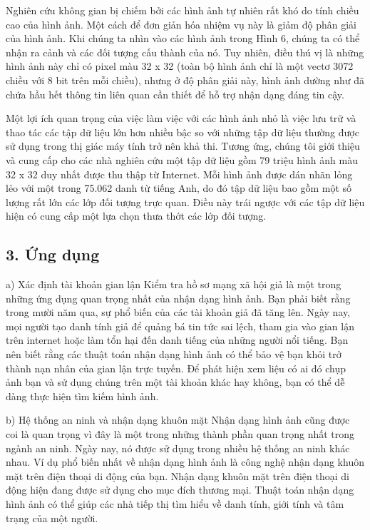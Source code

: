 \documentclass[../main.tex]{subfiles}
\begin{document}
Nghiên cứu không gian bị chiếm bởi các hình ảnh tự nhiên rất khó do tính chiều cao của hình ảnh. Một cách để đơn giản hóa nhiệm vụ này là giảm độ phân giải của hình ảnh. Khi chúng ta nhìn vào các hình ảnh trong Hình 6, chúng ta có thể nhận ra cảnh và các đối tượng cấu thành của nó. Tuy nhiên, điều thú vị là những hình ảnh này chỉ có pixel màu 32 x 32 (toàn bộ hình ảnh chỉ là một vectơ 3072 chiều với 8 bit trên mỗi chiều), nhưng ở độ phân giải này, hình ảnh dường như đã chứa hầu hết thông tin liên quan cần thiết để hỗ trợ nhận dạng đáng tin cậy.

Một lợi ích quan trọng của việc làm việc với các hình ảnh nhỏ là việc lưu trữ và thao tác các tập dữ liệu lớn hơn nhiều bậc so với những tập dữ liệu thường được sử dụng trong thị giác máy tính trở nên khả thi. Tương ứng, chúng tôi giới thiệu và cung cấp cho các nhà nghiên cứu một tập dữ liệu gồm 79 triệu hình ảnh màu 32 x 32 duy nhất được thu thập từ Internet. Mỗi hình ảnh được dán nhãn lỏng lẻo với một trong 75.062 danh từ tiếng Anh, do đó tập dữ liệu bao gồm một số lượng rất lớn các lớp đối tượng trực quan. Điều này trái ngược với các tập dữ liệu hiện có cung cấp một lựa chọn thưa thớt các lớp đối tượng.

\subsection*{3. Ứng dụng}

a) Xác định tài khoản gian lận
Kiểm tra hồ sơ mạng xã hội giả là một trong những ứng dụng quan trọng nhất của nhận dạng hình ảnh. Bạn phải biết rằng trong mười năm qua, sự phổ biến của các tài khoản giả đã tăng lên. Ngày nay, mọi người tạo danh tính giả để quảng bá tin tức sai lệch, tham gia vào gian lận trên internet hoặc làm tổn hại đến danh tiếng của những người nổi tiếng. Bạn nên biết rằng các thuật toán nhận dạng hình ảnh có thể bảo vệ bạn khỏi trở thành nạn nhân của gian lận trực tuyến. Để phát hiện xem liệu có ai đó chụp ảnh bạn và sử dụng chúng trên một tài khoản khác hay không, bạn có thể dễ dàng thực hiện tìm kiếm hình ảnh.

b) Hệ thống an ninh và nhận dạng khuôn mặt
Nhận dạng hình ảnh cũng được coi là quan trọng vì đây là một trong những thành phần quan trọng nhất trong ngành an ninh. Ngày nay, nó được sử dụng trong nhiều hệ thống an ninh khác nhau. Ví dụ phổ biến nhất về nhận dạng hình ảnh là công nghệ nhận dạng khuôn mặt trên điện thoại di động của bạn. Nhận dạng khuôn mặt trên điện thoại di động hiện đang được sử dụng cho mục đích thương mại. Thuật toán nhận dạng hình ảnh có thể giúp các nhà tiếp thị tìm hiểu về danh tính, giới tính và tâm trạng của một người.
\end{document}

